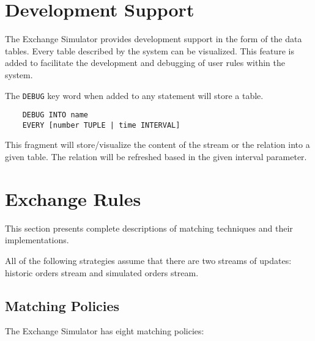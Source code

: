 \documentclass{article}
\begin{document}
\section{Development Support}

The Exchange Simulator provides development support in the form of the data tables. Every table described by the system can be visualized. This feature is added to facilitate the development and debugging of user rules within the system. 

The {\tt DEBUG} key word when added to any statement will store a table.

\begin{verbatim}
    DEBUG INTO name
    EVERY [number TUPLE | time INTERVAL] 
\end{verbatim} 

This fragment will store/visualize the content of the stream or the relation into a given table. The relation will be refreshed based in the given interval parameter.

\section{Exchange Rules}

This section presents complete descriptions of matching techniques and their implementations. 

All of the following strategies assume that there are two streams of updates: historic orders stream and simulated orders stream.

\subsection{Matching Policies}

The Exchange Simulator has eight matching policies:
\end{document}

